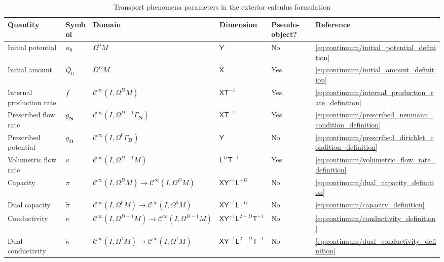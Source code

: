 \documentclass{elsarticle}
\theoremstyle{definition}
\newcommand{\amount}{\mathsf{X}}
\newcommand{\potential}{\mathsf{Y}}
\newcommand{\length}{\mathsf{L}}
\renewcommand{\time}{\mathsf{T}}
\newcommand{\Dirichlet}{\mathbf{D}}
\newcommand{\Neumann}{\mathbf{N}}
\newcommand{\topStrut}{\rule{0pt}{2.6ex}}
\begin{document}
\begin{table}[!ht]
  \caption{Transport phenomena parameters in the exterior calculus formulation}
  \label{tab:continuum/parameters}
  \centering
  \begin{tabular}{|l|l|l|l|l|l|}
    \hline
    Quantity
    & Symbol
    & Domain
    & Dimension
    & Pseudo-object?
    & Reference \topStrut \\[2pt]
    \hline
    \hline
    Initial potential
    & $u_0$
    & $\Omega^0 M$
    & $\potential$
    & No
    & \cref{eq:continuum/initial_potential_definition} \topStrut \\[2pt]
    \hline
    Initial amount
    & $Q_0$
    & $\Omega^D M$
    & $\amount$
    & Yes
    & \cref{eq:continuum/initial_amount_definition} \topStrut \\[2pt]
    \hline
    Internal production rate
    & $f$
    & $\mathcal{C}^\infty(I, \Omega^D M)$
    & $\amount \time^{-1}$
    & Yes
    & \cref{eq:continuum/internal_production_rate_definition} \topStrut \\[2pt]
    \hline
    Prescribed flow rate
    & $g_\Neumann$
    & $\mathcal{C}^\infty(I, \Omega^{D - 1} \Gamma_\Neumann)$
    & $\amount \time^{-1}$
    & Yes
    & \cref{eq:continuum/prescribed_neumann_condition_definition} \topStrut \\[2pt]
    \hline
    Prescribed potential
    & $g_\Dirichlet$
    & $\mathcal{C}^\infty(I, \Omega^0 \Gamma_\Dirichlet)$
    & $\potential$
    & No
    & \cref{eq:continuum/prescribed_dirichlet_condition_definition} \topStrut \\[2pt]
    \hline
    Volumetric flow rate
    & $v$
    & $\mathcal{C}^\infty(I, \Omega^{D - 1} M)$
    & $\length^D \time^{-1}$
    & Yes
    & \cref{eq:continuum/volumetric_flow_rate_definition} \topStrut \\[2pt]
    \hline
    Capacity
    & $\pi$
    & $\mathcal{C}^\infty(I, \Omega^D M) \to \mathcal{C}^\infty(I, \Omega^D M)$
    & $\amount \potential^{-1} \length^{-D}$
    & No
    & \cref{eq:continuum/dual_capacity_definition} \topStrut \\[2pt]
    \hline
    Dual capacity
    & $\widetilde{\pi}$
    & $\mathcal{C}^\infty(I, \Omega^0 M) \to \mathcal{C}^\infty(I, \Omega^0 M)$
    & $\amount \potential^{-1} \length^{-D}$
    & No
    & \cref{eq:continuum/capacity_definition} \topStrut \\[2pt]
    \hline
    Conductivity
    & $\kappa$
    & $\mathcal{C}^\infty(I, \Omega^{D - 1} M) \to \mathcal{C}^\infty(I, \Omega^{D - 1} M)$
    & $\amount \potential^{-1} \length^{2 - D} \time^{-1}$
    & No
    & \cref{eq:continuum/conductivity_definition} \topStrut \\[2pt]
    \hline
    Dual conductivity
    & $\widetilde{\kappa}$
    & $\mathcal{C}^\infty(I, \Omega^1 M) \to \mathcal{C}^\infty(I, \Omega^1 M)$
    & $\amount \potential^{-1} \length^{2 - D} \time^{-1}$
    & No
    & \cref{eq:continuum/dual_conductivity_definition} \topStrut \\[2pt]
    \hline
  \end{tabular}
\end{table}
\end{document}

